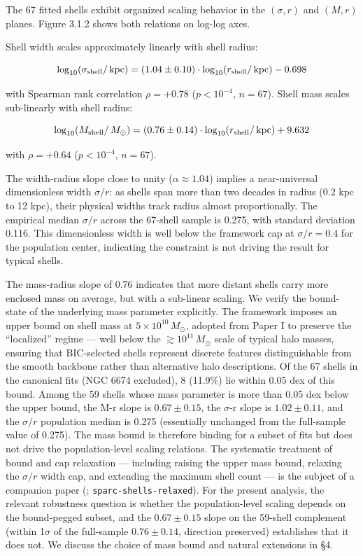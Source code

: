 \documentclass[linenumbers,trackchanges]{aastex701}
\begin{document}
The 67 fitted shells exhibit organized scaling behavior in the $(\sigma, r)$ and $(M, r)$ planes. Figure 3.1.2 shows both relations on log-log axes.

Shell width scales approximately linearly with shell radius:

\begin{equation}
\log_{10}(\sigma_{\rm shell}/\,\text{kpc}) = (1.04 \pm 0.10) \cdot \log_{10}(r_{\rm shell}/\,\text{kpc}) - 0.698
\end{equation}

with Spearman rank correlation $\rho = +0.78$ ($p < 10^{-4}$, $n = 67$). Shell mass scales sub-linearly with shell radius:

\begin{equation}
\log_{10}(M_{\rm shell}/\,M_\odot) = (0.76 \pm 0.14) \cdot \log_{10}(r_{\rm shell}/\,\text{kpc}) + 9.632
\end{equation}

with $\rho = +0.64$ ($p < 10^{-4}$, $n = 67$).

The width-radius slope close to unity ($\alpha \approx 1.04$) implies a near-universal dimensionless width $\sigma/r$: as shells span more than two decades in radius (0.2 kpc to 12 kpc), their physical widths track radius almost proportionally. The empirical median $\sigma/r$ across the 67-shell sample is 0.275, with standard deviation 0.116. This dimensionless width is well below the framework cap at $\sigma/r = 0.4$ for the population center, indicating the constraint is not driving the result for typical shells.

The mass-radius slope of 0.76 indicates that more distant shells carry more enclosed mass on average, but with a sub-linear scaling. We verify the bound-state of the underlying mass parameter explicitly. The framework imposes an upper bound on shell mass at $5 \times 10^{10}\,M_\odot$, adopted from Paper I to preserve the ``localized'' regime --- well below the $\gtrsim 10^{11}\,M_\odot$ scale of typical halo masses, ensuring that BIC-selected shells represent discrete features distinguishable from the smooth backbone rather than alternative halo descriptions. Of the 67 shells in the canonical fits (NGC 6674 excluded), 8 (11.9\%) lie within 0.05 dex of this bound. Among the 59 shells whose mass parameter is more than 0.05 dex below the upper bound, the M-r slope is $0.67 \pm 0.15$, the $\sigma$-r slope is $1.02 \pm 0.11$, and the $\sigma/r$ population median is 0.275 (essentially unchanged from the full-sample value of 0.275). The mass bound is therefore binding for a subset of fits but does not drive the population-level scaling relations. The systematic treatment of bound and cap relaxation --- including raising the upper mass bound, relaxing the $\sigma/r$ width cap, and extending the maximum shell count --- is the subject of a companion paper (\citealt{Bibb_PaperIII_inprep}; \texttt{sparc-shells-relaxed}). For the present analysis, the relevant robustness question is whether the population-level scaling depends on the bound-pegged subset, and the $0.67 \pm 0.15$ slope on the 59-shell complement (within 1$\sigma$ of the full-sample $0.76 \pm 0.14$, direction preserved) establishes that it does not. We discuss the choice of mass bound and natural extensions in \S4.
\end{document}

